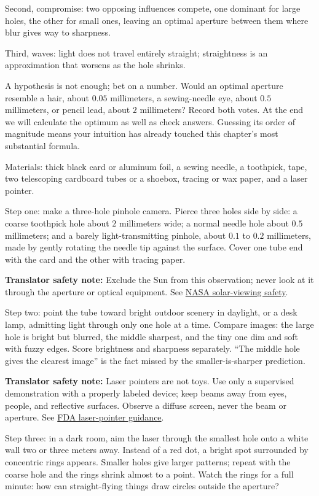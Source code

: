 Second, compromise: two opposing influences compete, one dominant for large holes, the other for small ones, leaving an optimal aperture between them where blur gives way to sharpness.

Third, waves: light does not travel entirely straight; straightness is an approximation that worsens as the hole shrinks.

A hypothesis is not enough; bet on a number. Would an optimal aperture resemble a hair, about \(0.05\) millimeters, a sewing-needle eye, about \(0.5\) millimeters, or pencil lead, about \(2\) millimeters? Record both votes. At the end we will calculate the optimum as well as check answers. Guessing its order of magnitude means your intuition has already touched this chapter's most substantial formula.


\begin{experiment}
Materials: thick black card or aluminum foil, a sewing needle, a toothpick, tape, two telescoping cardboard tubes or a shoebox, tracing or wax paper, and a laser pointer.

Step one: make a three-hole pinhole camera. Pierce three holes side by side: a coarse toothpick hole about \(2\) millimeters wide; a normal needle hole about \(0.5\) millimeters; and a barely light-transmitting pinhole, about \(0.1\) to \(0.2\) millimeters, made by gently rotating the needle tip against the surface. Cover one tube end with the card and the other with tracing paper.

\textbf{Translator safety note:} Exclude the Sun from this observation; never look at it through the aperture or optical equipment. See \href{https://science.nasa.gov/eclipses/safety/}{NASA solar-viewing safety}.

Step two: point the tube toward bright outdoor scenery in daylight, or a desk lamp, admitting light through only one hole at a time. Compare images: the large hole is bright but blurred, the middle sharpest, and the tiny one dim and soft with fuzzy edges. Score brightness and sharpness separately. ``The middle hole gives the clearest image'' is the fact missed by the smaller-is-sharper prediction.

\textbf{Translator safety note:} Laser pointers are not toys. Use only a supervised demonstration with a properly labeled device; keep beams away from eyes, people, and reflective surfaces. Observe a diffuse screen, never the beam or aperture. See \href{https://www.fda.gov/radiation-emitting-products/alerts-and-notices/illuminating-facts-about-laser-pointers}{FDA laser-pointer guidance}.

Step three: in a dark room, aim the laser through the smallest hole onto a white wall two or three meters away. Instead of a red dot, a bright spot surrounded by concentric rings appears. Smaller holes give larger patterns; repeat with the coarse hole and the rings shrink almost to a point. Watch the rings for a full minute: how can straight-flying things draw circles outside the aperture?
\end{experiment}

